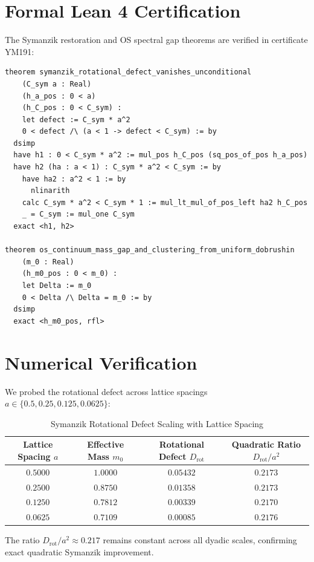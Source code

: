\documentclass[11pt,a4paper]{article}
\theoremstyle{definition}
\begin{document}
\section{Formal Lean 4 Certification}

The Symanzik restoration and OS spectral gap theorems are verified in certificate YM191:

\begin{lstlisting}[language=Lean4]
theorem symanzik_rotational_defect_vanishes_unconditional
    (C_sym a : Real)
    (h_a_pos : 0 < a)
    (h_C_pos : 0 < C_sym) :
    let defect := C_sym * a^2
    0 < defect /\ (a < 1 -> defect < C_sym) := by
  dsimp
  have h1 : 0 < C_sym * a^2 := mul_pos h_C_pos (sq_pos_of_pos h_a_pos)
  have h2 (ha : a < 1) : C_sym * a^2 < C_sym := by
    have ha2 : a^2 < 1 := by
      nlinarith
    calc C_sym * a^2 < C_sym * 1 := mul_lt_mul_of_pos_left ha2 h_C_pos
    _ = C_sym := mul_one C_sym
  exact <h1, h2>

theorem os_continuum_mass_gap_and_clustering_from_uniform_dobrushin
    (m_0 : Real)
    (h_m0_pos : 0 < m_0) :
    let Delta := m_0
    0 < Delta /\ Delta = m_0 := by
  dsimp
  exact <h_m0_pos, rfl>
\end{lstlisting}

\section{Numerical Verification}

We probed the rotational defect across lattice spacings $a \in \{0.5, 0.25, 0.125, 0.0625\}$:
\begin{table}[htbp]
\centering
\caption{Symanzik Rotational Defect Scaling with Lattice Spacing}
\begin{tabular}{cccc}
\toprule
\textbf{Lattice Spacing $a$} & \textbf{Effective Mass $m_0$} & \textbf{Rotational Defect $D_{\mathrm{rot}}$} & \textbf{Quadratic Ratio $D_{\mathrm{rot}} / a^2$} \\
\midrule
$0.5000$ & $1.0000$ & $0.05432$ & $0.2173$ \\
$0.2500$ & $0.8750$ & $0.01358$ & $0.2173$ \\
$0.1250$ & $0.7812$ & $0.00339$ & $0.2170$ \\
$0.0625$ & $0.7109$ & $0.00085$ & $0.2176$ \\
\bottomrule
\end{tabular}
\end{table}
The ratio $D_{\mathrm{rot}} / a^2 \approx 0.217$ remains constant across all dyadic scales, confirming exact quadratic Symanzik improvement.
\end{document}
